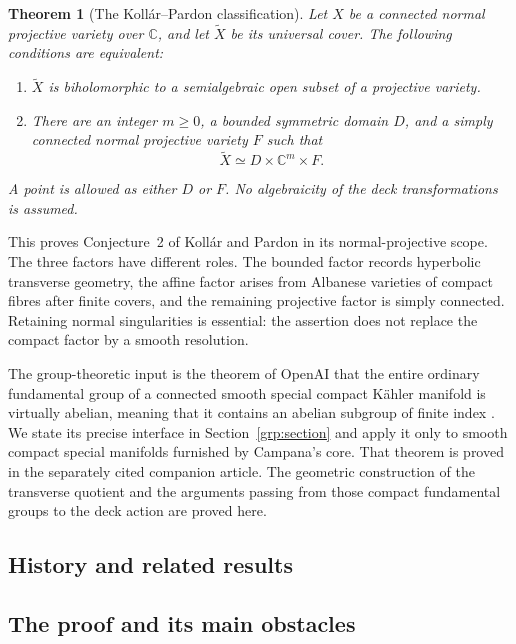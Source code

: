 \documentclass[11pt]{article}
\newtheorem{theorem}{Theorem}[section]
\theoremstyle{definition}
\theoremstyle{remark}
\newcommand{\C}{\mathbb C}
\begin{document}
\begin{theorem}[The Koll\'ar--Pardon classification]\label{thm:main}
Let \(X\) be a connected normal projective variety over \(\C\), and let
\(\widetilde X\) be its universal cover. The following conditions are
equivalent:
\begin{enumerate}[label=\textup{(\roman*)}]
\item \(\widetilde X\) is biholomorphic to a semialgebraic open subset
of a projective variety.
\item There are an integer \(m\geq0\), a bounded symmetric domain \(D\),
and a simply connected normal projective variety \(F\) such that
\[
                 \widetilde X\simeq D\times\C^m\times F.
\]
\end{enumerate}
A point is allowed as either \(D\) or \(F\). No algebraicity of the
deck transformations is assumed.
\end{theorem}

This proves Conjecture~2 of Koll\'ar and Pardon
\cite[Conjecture~2]{KollarPardon2012} in its normal-projective scope.
The three factors have different roles. The bounded factor records
hyperbolic transverse geometry, the affine factor arises from
Albanese varieties of compact fibres after finite covers, and the
remaining projective factor is simply connected. Retaining normal
singularities is essential: the assertion does not replace the
compact factor by a smooth resolution.

The group-theoretic input is the theorem of OpenAI that the entire
ordinary fundamental group of a connected smooth special compact
K\"ahler manifold is virtually abelian, meaning that it contains an
abelian subgroup of finite index
\cite[Theorem~1.1]{SpecialAbelianity}. We state its precise interface
in Section~\ref{grp:section} and apply it only to smooth compact
special manifolds furnished by Campana's core. That theorem is proved
in the separately cited companion article. The geometric construction of
the transverse quotient and the arguments passing from those compact
fundamental groups to the deck action are proved here.

\subsection{History and related results}


\subsection{The proof and its main obstacles}
\end{document}
